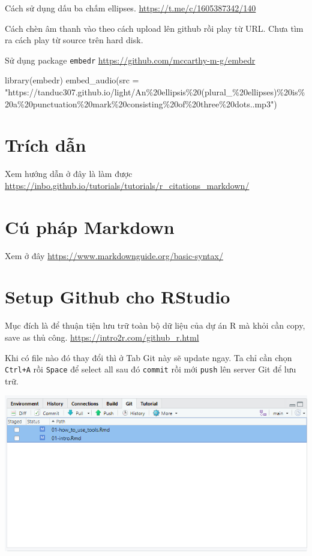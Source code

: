 \documentclass[
]{book}
\newenvironment{Shaded}{\begin{snugshade}}{\end{snugshade}}
\newcommand{\AttributeTok}[1]{\textcolor[rgb]{0.77,0.63,0.00}{#1}}
\newcommand{\FunctionTok}[1]{\textcolor[rgb]{0.00,0.00,0.00}{#1}}
\newcommand{\NormalTok}[1]{#1}
\newcommand{\StringTok}[1]{\textcolor[rgb]{0.31,0.60,0.02}{#1}}
\theoremstyle{definition}
\theoremstyle{definition}
\theoremstyle{definition}
\theoremstyle{definition}
\theoremstyle{remark}
\begin{document}
Cách sử dụng dấu ba chấm ellipses. \url{https://t.me/c/1605387342/140}

Cách chèn âm thanh vào theo cách upload lên github rồi play từ URL. Chưa tìm ra cách play từ source trên hard disk.

Sử dụng package \texttt{embedr} \url{https://github.com/mccarthy-m-g/embedr}

\begin{Shaded}
\begin{Highlighting}[]
\FunctionTok{library}\NormalTok{(embedr)}
\FunctionTok{embed\_audio}\NormalTok{(}\AttributeTok{src =} \StringTok{"https://tanduc307.github.io/light/An\%20ellipsis\%20(plural\_\%20ellipses)\%20is\%20a\%20punctuation\%20mark\%20consisting\%20of\%20three\%20dots..mp3"}\NormalTok{)}
\end{Highlighting}
\end{Shaded}

\hypertarget{truxedch-dux1eabn}{%
\section{Trích dẫn}\label{truxedch-dux1eabn}}

Xem hướng dẫn ở đây là làm được \url{https://inbo.github.io/tutorials/tutorials/r_citations_markdown/}

\hypertarget{cuxfa-phuxe1p-markdown}{%
\section{Cú pháp Markdown}\label{cuxfa-phuxe1p-markdown}}

Xem ở đây \url{https://www.markdownguide.org/basic-syntax/}

\hypertarget{setup-github-cho-rstudio}{%
\section{Setup Github cho RStudio}\label{setup-github-cho-rstudio}}

Mục đích là để thuận tiện lưu trữ toàn bộ dữ liệu của dự án R mà khỏi cần copy, save as thủ công. \url{https://intro2r.com/github_r.html}

Khi có file nào đó thay đổi thì ở Tab Git này sẽ update ngay. Ta chỉ cần chọn \texttt{Ctrl+A} rồi \texttt{Space} để select all sau đó \texttt{commit} rồi mới \texttt{push} lên server Git để lưu trữ.

\includegraphics{01-how_to_use_tools_insertimage_1.png}
\end{document}
